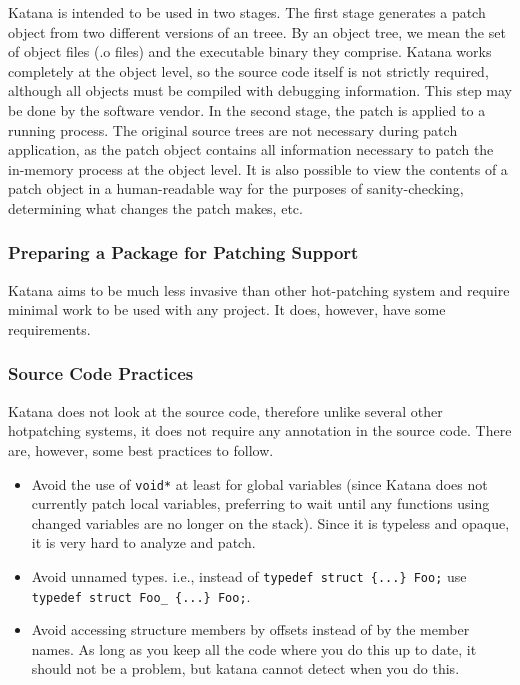 \documentclass[11pt]{article}
\begin{document}
   Katana is intended to be used in two stages. The first stage
   generates a patch object from two different versions of an
   treee. By an object tree, we mean the set of object files (.o files)
   and the executable binary they comprise. Katana works completely at
   the object level, so the source code itself is not strictly
   required, although all objects must be compiled with debugging
   information. This step may be done by the software vendor. In the
   second stage, the patch is applied to a running process. The
   original source trees are not necessary during patch application, as
   the patch object contains all information necessary to patch the
   in-memory process at the object level. It is also possible to view
   the contents of a patch object in a human-readable way for the
   purposes of sanity-checking, determining what changes the patch
   makes, etc.
\subsubsection{Preparing a Package for Patching Support}
\label{sec-3.5.1}

     Katana aims to be much less invasive than other hot-patching system
     and require minimal work to be used with any project. It does,
     however, have some requirements.\\
\subsubsection{Source Code Practices}
\label{sec-3.5.2}

    Katana does not look at the source code, therefore unlike several
    other hotpatching systems, it does not require any annotation in
    the source code. There are, however, some best practices to
    follow.
\begin{itemize}
\item Avoid the use of \texttt{void*} at least for global variables (since
      Katana does not currently patch local variables, preferring to
      wait until any functions using changed variables are no longer
      on the stack). Since it is typeless and opaque, it is very hard
      to analyze and patch.
\item Avoid unnamed types. i.e., instead of \texttt{typedef struct \{...\} Foo;}
      use \texttt{typedef struct Foo\_ \{...\} Foo;}.
\item Avoid accessing structure members by offsets instead of by the
      member names. As long as you keep all the code where you do this
      up to date, it should not be a problem, but katana cannot detect
      when you do this.
\end{itemize}
\end{document}
